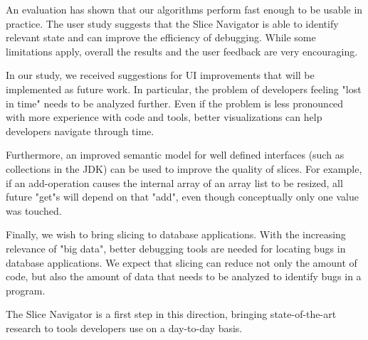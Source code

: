 \documentclass[
			english,
			review,
			]{elsarticle}
\begin{document}
An evaluation has shown that our algorithms perform fast enough to be usable in practice.
The user study suggests that the Slice Navigator is able to identify relevant state and can improve the efficiency of debugging.
While some limitations apply, overall the results and the user feedback are very encouraging.

In our study, we received suggestions for UI improvements that will be implemented as future work.
In particular, the problem of developers feeling "lost in time" needs to be analyzed further.
Even if the problem is less pronounced with more experience with code and tools, better visualizations can help developers navigate through time.

Furthermore, an improved semantic model for well defined interfaces (such as collections in the JDK) can be used to improve the quality of slices. 
For example, if an add-operation causes the internal array of an array list to be resized, all future "get"s will depend on that "add", even though conceptually only one value was touched.

Finally, we wish to bring slicing to database applications.
With the increasing relevance of "big data", better debugging tools are needed for locating bugs in database applications.
We expect that slicing can reduce not only the amount of code, but also the amount of data that needs to be analyzed to identify bugs in a program.

The Slice Navigator is a first step in this direction, bringing state-of-the-art research to tools developers use on a day-to-day basis.



\end{document}
